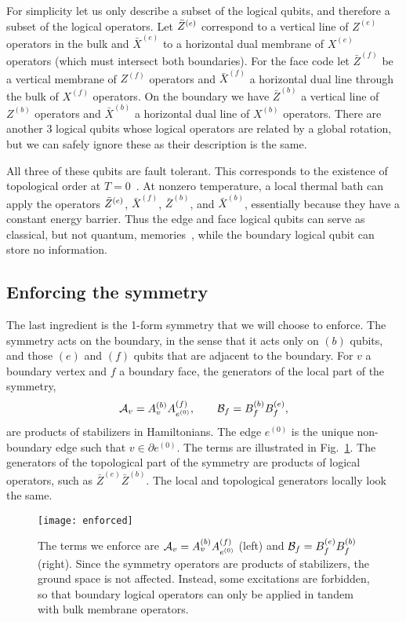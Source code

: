 For simplicity let us only describe a subset of the logical qubits, and therefore a subset of the logical operators. Let $\Bar{Z}^{(e)}$ correspond to a vertical line of $Z^{(e)}$ operators in the bulk and $\bar{X}^{(e)}$ to a horizontal dual membrane of $X^{(e)}$ operators (which must intersect both boundaries). For the face code let $\bar{Z}^{(f)}$ be a vertical membrane of $Z^{(f)}$ operators and $\bar{X}^{(f)}$ a horizontal dual line through the bulk of $X^{(f)}$ operators. On the boundary we have $\bar{Z}^{(b)}$ a vertical line of $Z^{(b)}$ operators and $\bar{X}^{(b)}$ a horizontal dual line of $X^{(b)}$ operators.  There are another 3 logical qubits whose logical operators are related by a global rotation, but we can safely ignore these as their description is the same. 

All three of these qubits are fault tolerant. This corresponds to the existence of topological order at $T=0$~\cite{Kitaev2003Fault}. At nonzero temperature, a local thermal bath can apply the operators $\Bar{Z}^{(e)}$, $\bar{X}^{(f)}$, $\bar{Z}^{(b)}$, and $\bar{X}^{(b)}$, essentially because they have a constant energy barrier. Thus the edge and face logical qubits can serve as classical, but not quantum, memories~\cite{CastelnovoChamon2008}, while the boundary logical qubit can store no information.

\subsection{Enforcing the symmetry} \label{sub:symm}

The last ingredient is the 1-form symmetry that we will choose to enforce. The symmetry acts on the boundary, in the sense that it acts only on $(b)$ qubits, and those $(e)$ and $(f)$ qubits that are adjacent to the boundary. For $v$ a boundary vertex and $f$ a boundary face, the generators of the local part of the symmetry,
\begin{align}
\cal{A}_v = A_v^{(b)} A_{e^{(0)}}^{(f)}, \qquad \cal{B}_f = B_f^{(b)}B_f^{(e)}, \label{eqn:sym}
\end{align}
are products of stabilizers in Hamiltonians. The edge $e^{(0)}$ is the unique non-boundary edge such that $v\in\partial e^{(0)}$.  The terms are illustrated in Fig.~\ref{fig:enforce}. The generators of the topological part of the symmetry are products of logical operators, such as $\bar{Z}^{(e)}\bar{Z}^{(b)}$. The local and topological generators locally look the same.

\begin{figure}
\centering
\texttt{[image: enforced]}
\caption[The terms we enforce]{The terms we enforce are $\cal{A}_v = A_v^{(b)} A_{e^{(0)}}^{(f)}$ (left) and $\cal{B}_f = B_f^{(e)} B_f^{(b)}$ (right). Since the symmetry operators are products of stabilizers, the ground space is not affected. Instead, some excitations are forbidden, so that boundary logical operators can only be applied in tandem with bulk membrane operators.}
\label{fig:enforce}
\end{figure}

